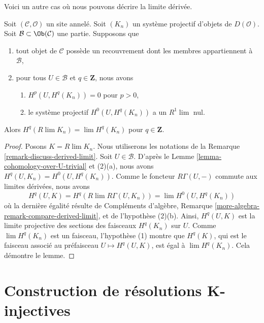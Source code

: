 \noindent
Voici un autre cas où nous pouvons décrire la limite dérivée.

\begin{lemma}
\label{lemma-derived-limit-suitable-system}
Soit $(\mathcal{C}, \mathcal{O})$ un site annelé. Soit $(K_n)$ un système
projectif d'objets de $D(\mathcal{O})$. Soit
$\mathcal{B} \subset \Ob(\mathcal{C})$ une partie. Supposons que
\begin{enumerate}
\item tout objet de $\mathcal{C}$ possède un recouvrement dont les membres
appartiennent à $\mathcal{B}$,
\item pour tous $U \in \mathcal{B}$ et $q \in \mathbf{Z}$, nous avons
\begin{enumerate}
\item $H^p(U, H^q(K_n)) = 0$ pour $p > 0$,
\item le système projectif $H^0(U, H^q(K_n))$ a un $R^1\lim$ nul.
\end{enumerate}
\end{enumerate}
Alors $H^q(R\lim K_n) = \lim H^q(K_n)$ pour $q \in \mathbf{Z}$.
\end{lemma}

\begin{proof}
Posons $K = R\lim K_n$. Nous utiliserons les notations de la Remarque
\ref{remark-discuss-derived-limit}. Soit $U \in \mathcal{B}$. D'après le
Lemme \ref{lemma-cohomology-over-U-trivial} et (2)(a), nous avons
$H^q(U, K_n) = H^0(U, H^q(K_n))$. Comme le foncteur $R\Gamma(U, -)$
commute aux limites dérivées, nous avons
$$
H^q(U, K) = H^q(R\lim R\Gamma(U, K_n)) = \lim H^0(U, H^q(K_n))
$$
où la dernière égalité résulte de Compléments d'algèbre, Remarque
\ref{more-algebra-remark-compare-derived-limit}, et de l'hypothèse (2)(b).
Ainsi, $H^q(U, K)$ est la limite projective des sections des faisceaux
$H^q(K_n)$ sur $U$. Comme $\lim H^q(K_n)$ est un faisceau, l'hypothèse
(1) montre que $H^q(K)$, qui est le faisceau associé au préfaisceau
$U \mapsto H^q(U, K)$, est égal à $\lim H^q(K_n)$. Cela démontre le lemme.
\end{proof}







\section{Construction de résolutions K-injectives}
\label{section-K-injective}

